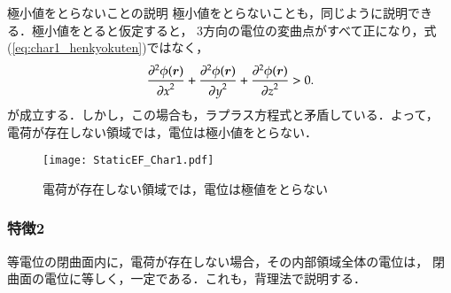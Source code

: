             \begin{mysmallsec}{極小値をとらないことの説明}
            極小値をとらないことも，同じように説明できる．極小値をとると仮定すると，
            3方向の電位の変曲点がすべて正になり，式(\ref{eq:char1_henkyokuten})ではなく，
                \begin{align}
                    \frac{{\partial}^{2} \phi(\boldsymbol{r})}{{\partial x}^{2}}
                      + \frac{{\partial}^{2} \phi(\boldsymbol{r})}{{\partial y}^{2}}
                      + \frac{{\partial}^{2} \phi(\boldsymbol{r})}{{\partial z}^{2}}
                    > 0.
                \end{align}
            が成立する．しかし，この場合も，ラプラス方程式と矛盾している．よって，
            電荷が存在しない領域では，電位は極小値をとらない．
            \end{mysmallsec}


                \begin{figure}[hbt]
                    \begin{center}
                        \texttt{[image: StaticEF\_Char1.pdf]}
                        \caption{電荷が存在しない領域では，電位は極値をとらない}
                        \label{fig:StaticEF_Char1}
                    \end{center}
                \end{figure}

        \subsubsection{特徴2}\label{subsubsec:char2}
            等電位の閉曲面内に，電荷が存在しない場合，その内部領域全体の電位は，
            閉曲面の電位に等しく，一定である．これも，背理法で説明する．

